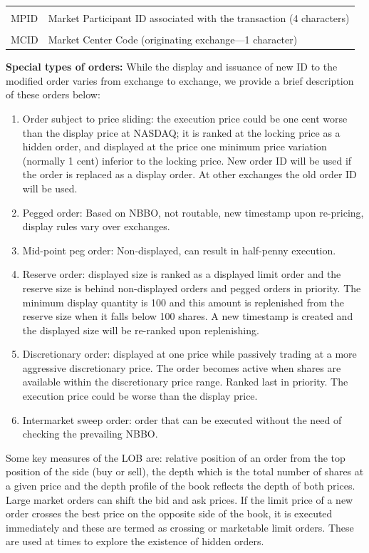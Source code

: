 \begin{table}[!ht]
\begin{tabular}{lp{}}
	& \\
	MPID & Market Participant ID associated with the transaction (4 characters) \\
	& \\
	MCID & Market Center Code (originating exchange---1 character) 
	\end{tabular}
	\end{table}
	

\noindent\textbf{Special types of orders:} While the display and issuance of new ID to the modified order varies from exchange to exchange, we provide a brief description of these orders below:
        \begin{enumerate}[1.]
        \item Order subject to price sliding: the execution price could be one cent worse than the display price at NASDAQ; it is ranked at the locking price as a hidden order, and displayed at the price one minimum price variation (normally 1 cent) inferior to the locking price. New order ID will be used if the order is replaced as a display order. At other exchanges the old order ID will be used.
        \item Pegged order: Based on NBBO, not routable, new timestamp upon re-pricing, display rules vary over exchanges.
        \item Mid-point peg order: Non-displayed, can result in half-penny execution.
        \item Reserve order: displayed size is ranked as a displayed limit order and the reserve size is behind non-displayed orders and pegged orders in priority. The minimum display quantity is 100 and this amount is replenished from the reserve size when it falls below 100 shares. A new timestamp is created and the displayed size will be re-ranked upon replenishing.
        \item Discretionary order: displayed at one price while passively trading at a more aggressive discretionary price. The order becomes active when shares are available within the discretionary price range. Ranked last in priority. The execution price could be worse than the display price.
        \item Intermarket sweep order: order that can be executed without the need of checking the prevailing NBBO.  
        \end{enumerate}


Some key measures of the LOB are: relative position of an order from the top position of the side (buy or sell), the depth which is the total number of shares at a given price and the depth profile of the book reflects the depth of both prices. Large market orders can shift the bid and ask prices. If the limit price of a new order crosses the best price on the opposite side of the book, it is executed immediately and these are termed as crossing or marketable limit orders. These are used at times to explore the existence of hidden orders.


